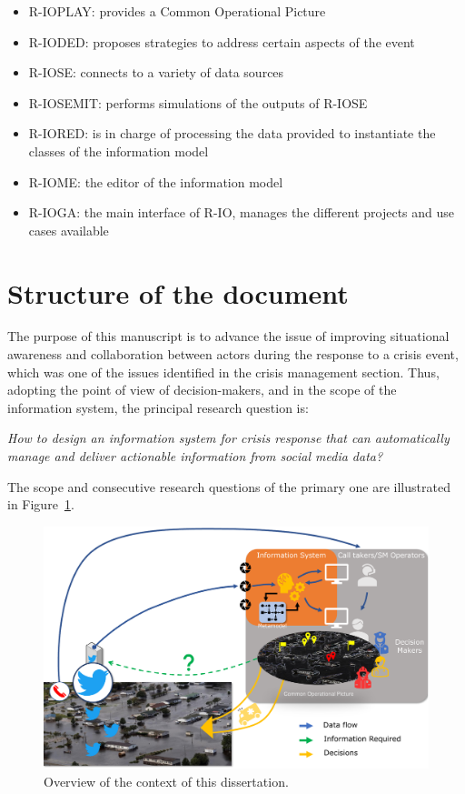 \begin{itemize}
    \item R-IOPLAY: provides a Common Operational Picture
    \item R-IODED: proposes strategies to address certain aspects of the event
    \item R-IOSE: connects to a variety of data sources
    \item R-IOSEMIT: performs simulations of the outputs of R-IOSE
    \item R-IORED: is in charge of processing the data provided to instantiate the classes of the information model
    \item R-IOME: the editor of the information model
    \item R-IOGA: the main interface of R-IO, manages the different projects and use cases available
\end{itemize}

\section{Structure of the document}
The purpose of this manuscript is to advance the issue of improving situational awareness and collaboration between actors during the response to a crisis event, which was one of the issues identified in the crisis management section.
Thus, adopting the point of view of decision-makers, and in the scope of the information system, the principal research question is:

\emph{How to design an information system for crisis response that can automatically manage and deliver actionable information from social media data?}

The scope and consecutive research questions of the primary one are illustrated in Figure~\ref{context:big-picture}.

\begin{figure}[htb]
    \centering
    \includegraphics[width=\textwidth,height=\paperheight,keepaspectratio]{figures/chap-1/big-picture.pdf}
    \caption{Overview of the context of this dissertation.}
    \label{context:big-picture}
\end{figure}

